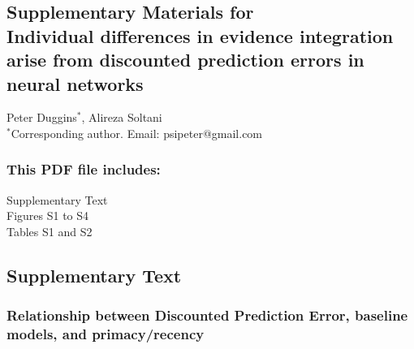 \documentclass[12pt]{article}
\def\scititle{
	Individual differences in evidence integration arise from discounted prediction errors in neural networks
}
\begin{document}

\newpage


\renewcommand{\thefigure}{S\arabic{figure}}
\renewcommand{\thetable}{S\arabic{table}}
\renewcommand{\theequation}{S\arabic{equation}}
\renewcommand{\thepage}{S\arabic{page}}
\setcounter{figure}{0}
\setcounter{table}{0}
\setcounter{equation}{0}
\setcounter{page}{1}

\begin{center}
\section*{Supplementary Materials for\\ \scititle}

Peter Duggins$^\ast$,
Alireza Soltani\\
\small$^\ast$Corresponding author. Email: psipeter@gmail.com
\end{center}

\subsubsection*{This PDF file includes:}
Supplementary Text\\
Figures S1 to S4\\
Tables S1 and S2

\newpage


\subsection*{Supplementary Text}

\subsubsection*{Relationship between Discounted Prediction Error, baseline models, and primacy/recency}
\end{document}
